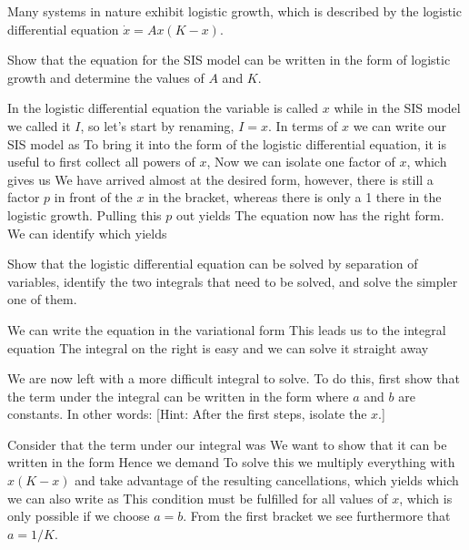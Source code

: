 \label{exGrowSIS}
Many systems in nature exhibit logistic growth, which is described by the logistic differential equation  $\dot{x}=Ax(K-x)$.

\subquestion Show that the equation for the SIS model can be written in the form of logistic growth and determine the values of $A$ and $K$.

\solution 
In the logistic differential equation the variable is called $x$ while in the SIS model we called it $I$, so let's start by renaming, $I=x$. In terms of $x$ we can write our SIS model as 
To bring it into the form of the logistic differential equation, it is useful to first collect all powers of $x$,
Now we can isolate one factor of $x$, which gives us
We have arrived almost at the desired form, however, there is still a factor $p$ in front of the $x$ in the bracket, whereas there is only a 1 there in the logistic growth. Pulling this $p$ out yields
The equation now has the right form. We can identify 
which yields

\subquestion
Show that the logistic differential equation can be solved by separation of variables, identify the two integrals that need to be solved, and solve the simpler one of them.  

\solution 
We can write the equation in the variational form 
This leads us to the integral equation 
The integral on the right is easy and we can solve it straight away

\subquestion
We are now left with a more difficult integral to solve. To do this, first show that the term under the integral can be written in the form
where $a$ and $b$ are constants. In other words: [Hint: After the first steps, isolate the $x$.]

\solution 
Consider that the term under our integral was 
We want to show that it can be written in the form 
Hence we demand 
To solve this we multiply everything with $x(K-x)$ and take advantage of the resulting cancellations, which yields 
which we can also write as 
This condition must be fulfilled for all values of $x$, which is only possible if we choose $a=b$. From the first bracket we see furthermore that $a=1/K$.

